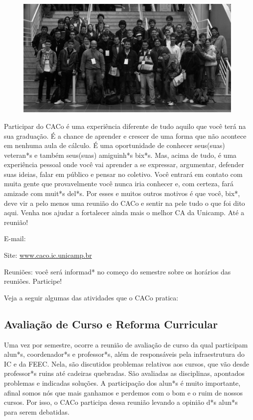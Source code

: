 \begin{figure}[H]
    \centering
    \includegraphics[width=.45\textwidth]{img/alem_da_graduacao/caco_fisl2.jpg}
\end{figure}

Participar do CACo é uma experiência diferente de tudo aquilo que você terá na
sua graduação. É a chance de aprender e crescer de uma forma que não acontece em
nenhuma aula de cálculo. É uma oportunidade de conhecer seus(suas) veteran*s e
também seus(suas) amiguinh*s bix*s. Mas, acima de tudo, é uma experiência
pessoal onde você vai aprender a se expressar, argumentar, defender suas ideias,
falar em público e pensar no coletivo. Você entrará em contato com muita gente
que provavelmente você nunca iria conhecer e, com certeza, fará amizade com
muit*s del*s. Por esses e muitos outros motivos é que você, bix*, deve vir a
pelo menos uma reunião do CACo e sentir na pele tudo o que foi dito aqui. Venha
nos ajudar a fortalecer ainda mais o melhor CA da Unicamp. Até a reunião!

\begin{compactitemize}
    \item  E-mail: 
    \item  Site: \url{www.caco.ic.unicamp.br}
    \item  Reuniões: você será informad* no começo do semestre sobre os horários
        das reuniões. Participe!
\end{compactitemize}

Veja a seguir algumas das atividades que o CACo pratica:

\subsection{Avaliação de Curso e Reforma Curricular}

Uma vez por semestre, ocorre a reunião de avaliação de curso da qual participam
alun*s, coordenador*s e professor*s, além de responsáveis pela infraestrutura do
IC e da FEEC. Nela, são discutidos problemas relativos aos cursos, que vão desde
professor*s ruins até cadeiras quebradas. São avaliadas as disciplinas,
apontados problemas e indicadas soluções. A participação dos alun*s é muito
importante, afinal somos nós que mais ganhamos e perdemos com o bom e o ruim de
nossos cursos. Por isso, o CACo participa dessa reunião levando a opinião d*s
alun*s para serem debatidas.

